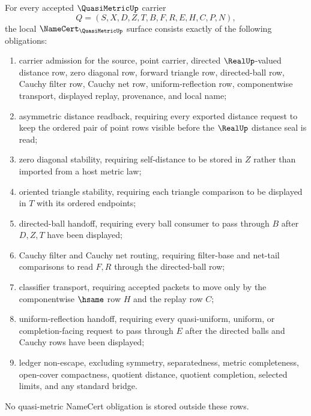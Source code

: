 \begin{theorem}
\label{thm:quasimetric-obligation-surface}
For every accepted $\QuasiMetricUp$ carrier
$$
Q=(S,X,D,Z,T,B,F,R,E,H,C,P,N),
$$
the local $\NameCert_{\QuasiMetricUp}$ surface consists exactly of the following obligations:
\begin{enumerate}
\item carrier admission for the source, point carrier, directed $\RealUp$-valued distance row, zero diagonal row, forward triangle row, directed-ball row, Cauchy filter row, Cauchy net row, uniform-reflection row, componentwise transport, displayed replay, provenance, and local name;
\item asymmetric distance readback, requiring every exported distance request to keep the ordered pair of point rows visible before the $\RealUp$ distance seal is read;
\item zero diagonal stability, requiring self-distance to be stored in $Z$ rather than imported from a host metric law;
\item oriented triangle stability, requiring each triangle comparison to be displayed in $T$ with its ordered endpoints;
\item directed-ball handoff, requiring every ball consumer to pass through $B$ after $D,Z,T$ have been displayed;
\item Cauchy filter and Cauchy net routing, requiring filter-base and net-tail comparisons to read $F,R$ through the directed-ball row;
\item classifier transport, requiring accepted packets to move only by the componentwise $\hsame$ row $H$ and the replay row $C$;
\item uniform-reflection handoff, requiring every quasi-uniform, uniform, or completion-facing request to pass through $E$ after the directed balls and Cauchy rows have been displayed;
\item ledger non-escape, excluding symmetry, separatedness, metric completeness, open-cover compactness, quotient distance, quotient completion, selected limits, and any standard bridge.
\end{enumerate}
No quasi-metric NameCert obligation is stored outside these rows.
\end{theorem}
